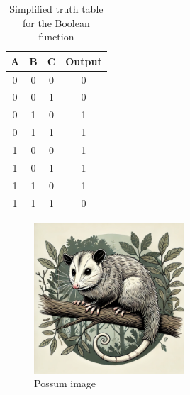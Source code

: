 \begin{table}[H]
    \centering
    \begin{tabular}{|c|c|c|c|}
        \hline
        A & B & C & Output \\
        \hline
        0 & 0 & 0 & 0 \\
        0 & 0 & 1 & 0 \\
        0 & 1 & 0 & 1 \\
        0 & 1 & 1 & 1 \\
        1 & 0 & 0 & 1 \\
        1 & 0 & 1 & 1 \\
        1 & 1 & 0 & 1 \\
        1 & 1 & 1 & 0 \\
        \hline
    \end{tabular}
    \caption{Simplified truth table for the Boolean function}
    \label{tab:simplified_truth_table}
\end{table}

\begin{figure}
    \centering
    \includegraphics[width=0.5\textwidth]{figures/possum.png}
    \caption{Possum image}
    \label{fig:possum}
\end{figure}

